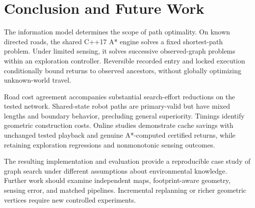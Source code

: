 \section{Conclusion and Future Work}
The information model determines the scope of path optimality. On known directed roads, the shared C++17 A* engine solves a fixed shortest-path problem. Under limited sensing, it solves successive observed-graph problems within an exploration controller. Reversible recorded entry and locked execution conditionally bound returns to observed ancestors, without globally optimizing unknown-world travel.

Road cost agreement accompanies substantial search-effort reductions on the tested network. Shared-state robot paths are primary-valid but have mixed lengths and boundary behavior, precluding general superiority. Timings identify geometric construction costs. Online studies demonstrate cache savings with unchanged tested playback and genuine A*-computed certified returns, while retaining exploration regressions and nonmonotonic sensing outcomes.

The resulting implementation and evaluation provide a reproducible case study of graph search under different assumptions about environmental knowledge. Further work should examine independent maps, footprint-aware geometry, sensing error, and matched pipelines. Incremental replanning or richer geometric vertices require new controlled experiments.
